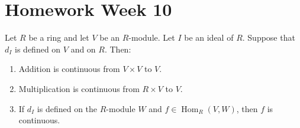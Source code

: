 \section{Homework Week 10}

\begin{exercise}
    Let \(R\) be a ring and let \(V\) be an \(R\)-module. Let \(I\) be an ideal of
    \(R\). Suppose that \(d_I\) is defined on \(V\) and on \(R\). Then:
    \begin{enumerate}
        \item Addition is continuous from \(V\times V\) to \(V\).
        \item Multiplication is continuous from \(R\times V\) to \(V\).
        \item If \(d_I\) is defined on the \(R\)-module \(W\) and
              \(f\in \operatorname{Hom}_R(V,W)\), then \(f\) is continuous.
    \end{enumerate}
    \end{exercise}
    
